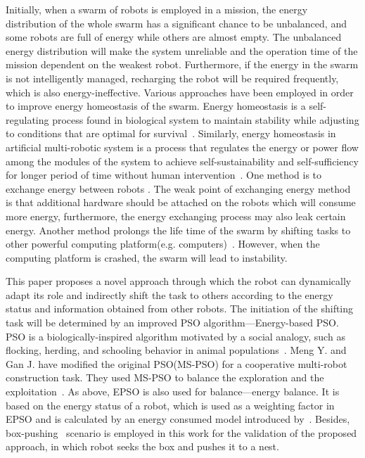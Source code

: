 \documentclass[journal]{IEEEtran}
\begin{document}
Initially, when a swarm of robots is employed in a mission, the energy distribution of the whole swarm has a significant chance to be unbalanced, and some robots are full of energy while others are almost empty. The unbalanced energy distribution will make the system unreliable and the operation time of the mission dependent on the weakest robot. Furthermore, if the energy in the swarm is not intelligently managed, recharging the robot will be required frequently, which is also energy-ineffective. Various approaches have been employed in order to improve energy homeostasis of the swarm. Energy homeostasis is a self-regulating process found in biological system to maintain stability while adjusting to conditions that are optimal for survival~\cite{Encyclopedia}. Similarly, energy homeostasis in artificial multi-robotic system is a process that regulates the energy or power flow among the modules of the system to achieve self-sustainability and self-sufficiency for longer period of time without human intervention~\cite{Humza}. One method is to exchange energy between robots \cite{Humza, Krieger, MelhuishK, Mokhtar}. The weak point of exchanging energy method is that additional hardware should be attached on the robots which will consume more energy, furthermore, the energy exchanging process may also leak certain energy. Another method prolongs the life time of the swarm by shifting tasks to other powerful computing platform(e.g. computers)~\cite{O'Hara}. However, when the computing platform is crashed, the swarm will lead to instability.

This paper proposes a novel approach through which the robot can dynamically adapt its role and indirectly shift the task to others according to the energy status and information obtained from other robots. The initiation of the shifting task will be determined by an improved PSO algorithm---Energy-based PSO. PSO is a biologically-inspired algorithm motivated by a social analogy, such as flocking, herding, and schooling behavior in animal populations~\cite{Kennedy}. Meng Y. and Gan J. have modified the original PSO(MS-PSO) for a cooperative multi-robot construction task. They used MS-PSO to balance the exploration and the exploitation~\cite{Meng}. As above, EPSO is also used for balance---energy balance. It is based on the energy status of a robot, which is used as a weighting factor in EPSO and is calculated by an energy consumed model introduced by~\cite{Mei}. Besides, box-pushing~\cite{Mataric} scenario is employed in this work for the validation of the proposed approach, in which robot seeks the box and pushes it to a nest.
\end{document}
